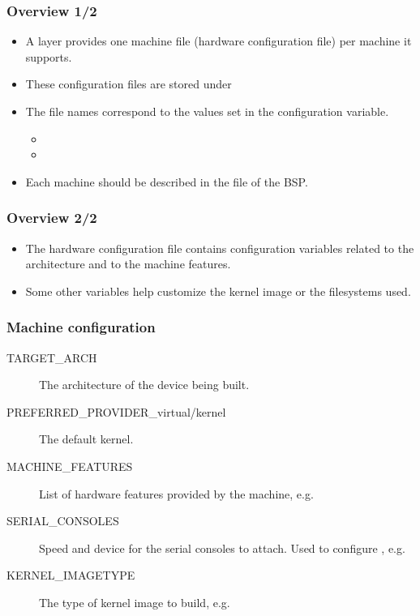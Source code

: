 \begin{frame}
  \frametitle{Overview 1/2}
  \begin{itemize}
    \item A layer provides one machine file (hardware configuration
      file) per machine it supports.
    \item These configuration files are stored under
    \item The file names correspond to the values set in the
       configuration variable.
      \begin{itemize}
        \item {}
        \item {}
      \end{itemize}
    \item Each machine should be described in the  file
      of the BSP.
  \end{itemize}
\end{frame}

\begin{frame}
  \frametitle{Overview 2/2}
  \begin{itemize}
    \item The hardware configuration file contains configuration
      variables related to the architecture and to the machine
      features.
    \item Some other variables help customize the kernel image or the
      filesystems used.
  \end{itemize}
\end{frame}

\begin{frame}
  \frametitle{Machine configuration}
  \begin{description}
    \item[TARGET\_ARCH] The architecture of the device being built.
    \item[PREFERRED\_PROVIDER\_virtual/kernel] The default kernel.
    \item[MACHINE\_FEATURES] List of hardware features provided by the
      machine, e.g. 
    \item[SERIAL\_CONSOLES] Speed and device for the serial consoles to
	    attach. Used to configure ,
      e.g. 
    \item[KERNEL\_IMAGETYPE] The type of kernel image to build, e.g.
  \end{description}
\end{frame}

